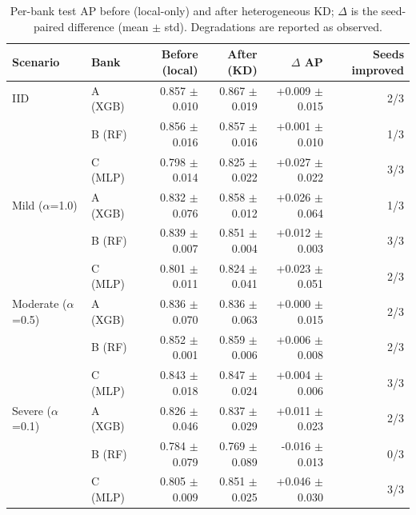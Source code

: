 \begin{table}[t]
\centering
\scriptsize
\caption{Per-bank test AP before (local-only) and after heterogeneous KD; $\Delta$ is the seed-paired difference (mean $\pm$ std). Degradations are reported as observed.}
\label{tab:perbank}
\begin{tabular}{llrrrr}
\toprule
Scenario & Bank & Before (local) & After (KD) & $\Delta$ AP & Seeds improved \\
\midrule
IID & A (XGB) & 0.857 $\pm$ 0.010 & 0.867 $\pm$ 0.019 & +0.009 $\pm$ 0.015 & 2/3 \\
 & B (RF) & 0.856 $\pm$ 0.016 & 0.857 $\pm$ 0.016 & +0.001 $\pm$ 0.010 & 1/3 \\
 & C (MLP) & 0.798 $\pm$ 0.014 & 0.825 $\pm$ 0.022 & +0.027 $\pm$ 0.022 & 3/3 \\
\midrule
Mild ($\alpha$=1.0) & A (XGB) & 0.832 $\pm$ 0.076 & 0.858 $\pm$ 0.012 & +0.026 $\pm$ 0.064 & 1/3 \\
 & B (RF) & 0.839 $\pm$ 0.007 & 0.851 $\pm$ 0.004 & +0.012 $\pm$ 0.003 & 3/3 \\
 & C (MLP) & 0.801 $\pm$ 0.011 & 0.824 $\pm$ 0.041 & +0.023 $\pm$ 0.051 & 2/3 \\
\midrule
Moderate ($\alpha$=0.5) & A (XGB) & 0.836 $\pm$ 0.070 & 0.836 $\pm$ 0.063 & +0.000 $\pm$ 0.015 & 2/3 \\
 & B (RF) & 0.852 $\pm$ 0.001 & 0.859 $\pm$ 0.006 & +0.006 $\pm$ 0.008 & 2/3 \\
 & C (MLP) & 0.843 $\pm$ 0.018 & 0.847 $\pm$ 0.024 & +0.004 $\pm$ 0.006 & 3/3 \\
\midrule
Severe ($\alpha$=0.1) & A (XGB) & 0.826 $\pm$ 0.046 & 0.837 $\pm$ 0.029 & +0.011 $\pm$ 0.023 & 2/3 \\
 & B (RF) & 0.784 $\pm$ 0.079 & 0.769 $\pm$ 0.089 & -0.016 $\pm$ 0.013 & 0/3 \\
 & C (MLP) & 0.805 $\pm$ 0.009 & 0.851 $\pm$ 0.025 & +0.046 $\pm$ 0.030 & 3/3 \\
\bottomrule
\end{tabular}
\end{table}
